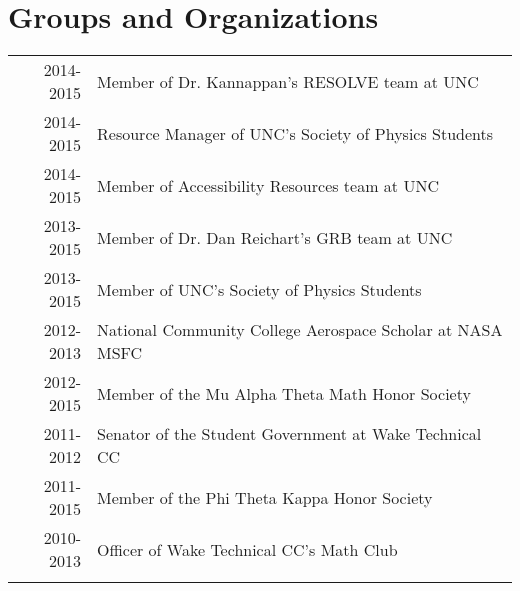 \documentclass[a4paper,10pt]{article} %
\begin{document}

\section{Groups and Organizations}

\begin{tabular}{rl}
2014-2015 & Member of Dr. Kannappan's RESOLVE team at UNC\\
2014-2015 & Resource Manager of UNC's Society of Physics Students\\
2014-2015 & Member of Accessibility Resources team at UNC\\
2013-2015 & Member of Dr. Dan Reichart's GRB team at UNC\\
2013-2015 & Member of UNC's Society of Physics Students\\
2012-2013 & National Community College Aerospace Scholar at NASA MSFC\\
2012-2015 & Member of the Mu Alpha Theta Math Honor Society\\
2011-2012 & Senator of the Student Government at Wake Technical CC\\
2011-2015 & Member of the Phi Theta Kappa Honor Society\\
2010-2013 & Officer of Wake Technical CC's Math Club\\
&\\
\end{tabular}
\bigskip



%
%
%
%

\end{document}
